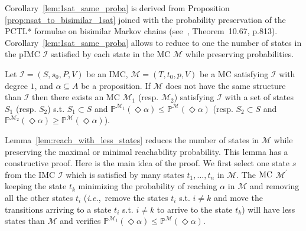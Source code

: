 \documentclass{llncs}
\newcommand{\mc}{\textnormal{MC}}
\newcommand{\imc}{\textnormal{IMC}}
\newcommand{\pimc}{\textnormal{pIMC}}
\newcommand{\ie} {{\em i.e.},\ }
\newcommand{\Proba}            {\ensuremath{\mathbb{P}}}
\newcommand{\ltlExists}{\ensuremath{\Diamond}}
\begin{document}
Corollary~\ref{lem:1sat_same_proba} is derived from Proposition \ref{prop:nsat_to_bisimilar_1sat}
joined with the probability preservation of the PCTL* formulae on bisimilar Markov chains
(see~\cite{Baier2008PMC}, Theorem~10.67, p.813).
Corollary~\ref{lem:1sat_same_proba} 
allows to reduce to one the number of states in the {\pimc} $\mathcal{I}$
satisfied by each state in the {\mc} $\mathcal{M}$ while preserving probabilities.

\begin{lemma}\label{lem:reach_with_less_states}
	Let $\mathcal{I} = (S,s_0,P,V)$ be an {\imc},
	$\mathcal{M} = (T,t_0,p,V)$ be a {\mc} satisfying $\mathcal{I}$ with degree $1$, and
	$\alpha \subseteq A$ be a proposition.
	If $\mathcal{M}$ does not have the same structure than $\mathcal{I}$
	then there exists an {\mc} $\mathcal{M}_1$ (resp. $\mathcal{M}_2$) 
	satisfying $\mathcal{I}$ with a set of states $S_1$ (resp. $S_2$)
	s.t. $S_1 \subset S$ and $\Proba^{\mathcal{M}_1}(\ltlExists \alpha) \leq \Proba^{\mathcal{M}}(\ltlExists \alpha)$
	(resp. $S_2 \subset S$ and $\Proba^{\mathcal{M}_2}(\ltlExists \alpha) \geq \Proba^{\mathcal{M}}(\ltlExists \alpha)$). 
\end{lemma}

Lemma~\ref{lem:reach_with_less_states} reduces the number of states in $\mathcal{M}$ while preserving the maximal or minimal reachability probability.
This lemma has a constructive proof.
Here is the main idea of the proof.
We first select one state $s$ from the {\imc} $\mathcal{I}$
which is satisfied by many states $t_1, \ldots, t_n$ in $\mathcal{M}$.
The ${\mc}$ $\mathcal{M}^\prime$ keeping the state $t_k$ minimizing the probability of reaching $\alpha$ in $\mathcal{M}$ and removing all the other states $t_i$
(\ie remove the states $t_i$ s.t. $i \neq k$ and 
move the transitions arriving to a state $t_i$ s.t. $i \neq k$ to arrive to the state $t_k$)
will have less states than $\mathcal{M}$ and verifies $\Proba^{\mathcal{M}_1}(\ltlExists \alpha) \leq \Proba^{\mathcal{M}}(\ltlExists \alpha)$.
\end{document}
